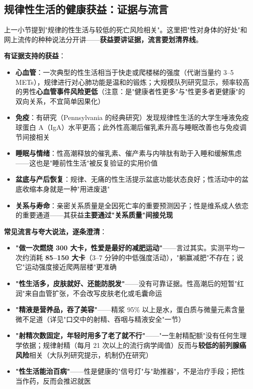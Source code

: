 \subsection{规律性生活的健康获益：证据与流言}

上一小节提到"规律的性生活与较低的死亡风险相关"。这里把"性对身体的好处"和网上流传的种种说法分开讲——\textbf{获益要讲证据，流言要划清界线}。

\vspace{0.5em}
\noindent\textbf{有证据支持的获益}：

\begin{itemize}
	\item \textbf{心血管}：一次典型的性生活相当于快走或爬楼梯的强度（代谢当量约 3--5 METs），规律进行对心肺功能是温和的锻炼；大规模队列研究显示，频率较高的男性\textbf{心血管事件风险更低}（注意：是"健康者性更多"与"性更多者更健康"的双向关系，不宜简单因果化）
	\item \textbf{免疫}：有研究（Pennsylvania 的经典研究）发现规律性生活的大学生唾液免疫球蛋白 A（IgA）水平更高；此外性高潮后催乳素升高与睡眠改善也与免疫调节间接相关
	\item \textbf{睡眠与情绪}：性高潮释放的催乳素、催产素与内啡肽有助于入睡和缓解焦虑——这也是"睡前性生活"被反复验证的实用价值
	\item \textbf{盆底与产后恢复}：规律、无痛的性生活提示盆底功能状态良好；性活动中的盆底收缩本身就是一种"用进废退"
	\item \textbf{关系与寿命}：亲密关系质量是全因死亡率的重要预测因子；性是维系成人依恋的重要通道——其获益\textbf{主要通过"关系质量"间接兑现}
\end{itemize}

\vspace{0.5em}
\noindent\textbf{常见流言与夸大说法，逐条澄清}：

\begin{itemize}
	\item \textbf{"做一次燃烧 300 大卡，性爱是最好的减肥运动"}——言过其实。实测平均一次约消耗 \textbf{85--150 大卡}（3--7 分钟的中低强度活动），"躺赢减肥"不存在；说它"运动强度接近爬两层楼"更准确
	\item \textbf{"性生活多，皮肤就好、还能防脱发"}——没有可靠证据。性高潮后的短暂"红润"来自血管扩张，不会改写皮肤老化或毛囊命运
	\item \textbf{"精液是营养品，吞了美容"}——精浆 95\% 以上是水，蛋白质与微量元素含量微不足道（详见"口交中的射精、吞咽与精液安全"一节）
	\item \textbf{"射精次数固定，年轻时用多了老了就不行"}——"一生射精配额"没有任何生理学依据；规律射精（每月 21 次以上的流行病学阈值）反而与\textbf{较低的前列腺癌风险}相关（大队列研究提示，机制仍在研究）
	\item \textbf{"性生活能治百病"}——性是健康的"信号灯"与"助推器"，不是治疗手段；把性当作药，反而会推迟就医
\end{itemize}

